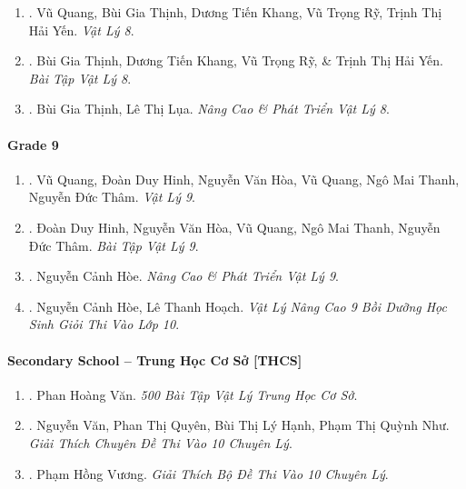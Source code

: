 \documentclass{article}
\begin{document}
\begin{enumerate}
	\item \cite{SGK_Vat_Ly_8}. Vũ Quang, Bùi Gia Thịnh, Dương Tiến Khang, Vũ Trọng Rỹ, Trịnh Thị Hải Yến. {\it Vật Lý 8}.\hfill{\sf[reading]}
	
	\item \cite{SBT_Vat_Ly_8}. Bùi Gia Thịnh, Dương Tiến Khang, Vũ Trọng Rỹ, \& Trịnh Thị Hải Yến. {\it Bài Tập Vật Lý 8}.\hfill{\sf[reading]}
	
	\item \cite{Thinh_Lua_ncpt_Vat_Ly_8}. Bùi Gia Thịnh, Lê Thị Lụa. {\it Nâng Cao \& Phát Triển Vật Lý 8}.\hfill{\sf[reading]}
\end{enumerate}

\paragraph{Grade 9}

\begin{enumerate}
	\item \cite{SGK_Vat_Ly_9}. Vũ Quang, Đoàn Duy Hinh, Nguyễn Văn Hòa, Vũ Quang, Ngô Mai Thanh, Nguyễn Đức Thâm. {\it Vật Lý 9}.\hfill{\sf[reading]}
	
	\item \cite{SBT_Vat_Ly_9}. Đoàn Duy Hinh, Nguyễn Văn Hòa, Vũ Quang, Ngô Mai Thanh, Nguyễn Đức Thâm. {\it Bài Tập Vật Lý 9}.\hfill{\sf[reading]}
	
	\item \cite{Hoe_Vat_Ly_9}. Nguyễn Cảnh Hòe. {\it Nâng Cao \& Phát Triển Vật Lý 9}.\hfill{\sf[reading]}
	
	\item \cite{Hoe_Hoach_Vat_Ly_nang_cao_9}. Nguyễn Cảnh Hòe, Lê Thanh Hoạch. {\it Vật Lý Nâng Cao 9 Bồi Dưỡng Học Sinh Giỏi Thi Vào Lớp 10}.\hfill{\sf[reading]}
\end{enumerate}

\paragraph{Secondary School -- Trung Học Cơ Sở [THCS]}

\begin{enumerate}
	\item \cite{Van_500_BT_Vat_Ly_THCS}. Phan Hoàng Văn. {\it 500 Bài Tập Vật Lý Trung Học Cơ Sở}.\hfill{\sf[reading]}
	
	\item \cite{Van_Quyen_Hanh_Nhu_10_chuyen_Ly}. Nguyễn Văn, Phan Thị Quyên, Bùi Thị Lý Hạnh, Phạm Thị Quỳnh Như. {\it Giải Thích Chuyên Đề Thi Vào 10 Chuyên Lý}.\hfill{\sf[reading]}
	
	\item \cite{Vuong_10_chuyen_Ly}. Phạm Hồng Vương. {\it Giải Thích Bộ Đề Thi Vào 10 Chuyên Lý}.\hfill{\sf[reading]}
\end{enumerate}
\end{document}

